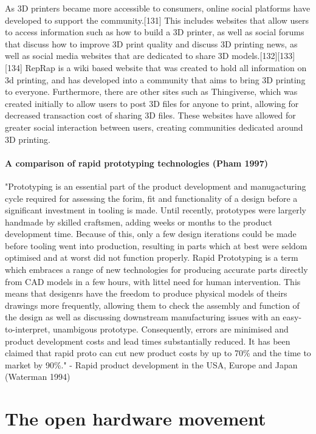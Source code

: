 As 3D printers became more accessible to consumers, online social platforms have developed to support the community.[131] This includes websites that allow users to access information such as how to build a 3D printer, as well as social forums that discuss how to improve 3D print quality and discuss 3D printing news, as well as social media websites that are dedicated to share 3D models.[132][133][134] RepRap is a wiki based website that was created to hold all information on 3d printing, and has developed into a community that aims to bring 3D printing to everyone. Furthermore, there are other sites such as Thingiverse, which was created initially to allow users to post 3D files for anyone to print, allowing for decreased transaction cost of sharing 3D files. These websites have allowed for greater social interaction between users, creating communities dedicated around 3D printing.


\paragraph{A comparison of rapid prototyping technologies (Pham 1997)}

"Prototyping is an essential part of the product development and manugacturing cycle required for assessing the forim, fit and functionality of a design before a significant investment in tooling is made.
Until recently, prototypes were largerly handmade by skilled craftsmen, adding weeks or months to the product development time.
Because of this, only a few design iterations could be made before tooling went into production, resulting in parts which at best were seldom optimised and at worst did not function properly.
Rapid Prototyping is a term which embraces a range of new technologies for producing accurate parts directly from CAD models in a few hours, with littel need for human intervention.
This means that desigenrs have the freedom to produce physical models of theirs drawings more frequently, allowing them to check the assembly and function of the design as well as discussing downstream manufacturing issues with an easy-to-interpret, unambigous prototype.
Consequently, errors are minimised and product development costs and lead times substantially reduced.
It has been claimed that rapid proto can cut new product costs by up to 70\% and the time to market by 90\%."
- Rapid product development in the USA, Europe and Japan (Waterman 1994)




\section{The open hardware movement} %

